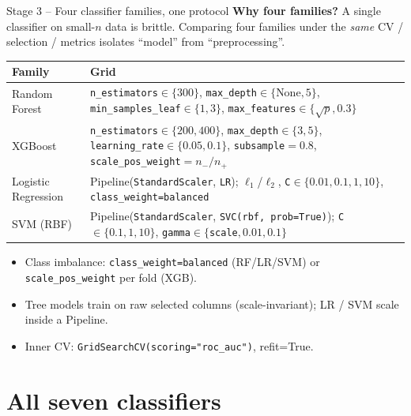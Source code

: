 \documentclass[10pt,aspectratio=169]{beamer}
\begin{document}
\begin{frame}{Stage 3 -- Four classifier families, one protocol}
  \textbf{Why four families?} A single classifier on small-$n$ data is
  brittle. Comparing four families under the \emph{same} CV / selection /
  metrics isolates ``model'' from ``preprocessing''.
  \scriptsize
  \begin{center}
  \begin{tabular}{p{2.7cm}p{9.6cm}}
    \toprule
    Family & Grid \\
    \midrule
    Random Forest &
    \texttt{n\_estimators}$\in\{300\}$,
    \texttt{max\_depth}$\in\{\text{None},5\}$,
    \texttt{min\_samples\_leaf}$\in\{1,3\}$,
    \texttt{max\_features}$\in\{\sqrt{p},0.3\}$ \\[2pt]
    XGBoost &
    \texttt{n\_estimators}$\in\{200,400\}$,
    \texttt{max\_depth}$\in\{3,5\}$,
    \texttt{learning\_rate}$\in\{0.05,0.1\}$,
    \texttt{subsample}$=0.8$,
    \texttt{scale\_pos\_weight}$=n_-/n_+$ \\[2pt]
    Logistic Regression &
    Pipeline(\texttt{StandardScaler}, \texttt{LR}); $\ell_1$/$\ell_2$,
    \texttt{C}$\in\{0.01,0.1,1,10\}$, \texttt{class\_weight=balanced} \\[2pt]
    SVM (RBF) &
    Pipeline(\texttt{StandardScaler}, \texttt{SVC(rbf, prob=True)});
    \texttt{C}$\in\{0.1,1,10\}$, \texttt{gamma}$\in\{$\texttt{scale}$,0.01,0.1\}$ \\
    \bottomrule
  \end{tabular}
  \end{center}
  \begin{itemize}
    \item Class imbalance: \texttt{class\_weight=balanced} (RF/LR/SVM) or
          \texttt{scale\_pos\_weight} per fold (XGB).
    \item Tree models train on raw selected columns (scale-invariant);
          LR / SVM scale inside a Pipeline.
    \item Inner CV: \texttt{GridSearchCV(scoring="roc\_auc")}, refit=True.
  \end{itemize}
\end{frame}

\section{All seven classifiers}
\end{document}
